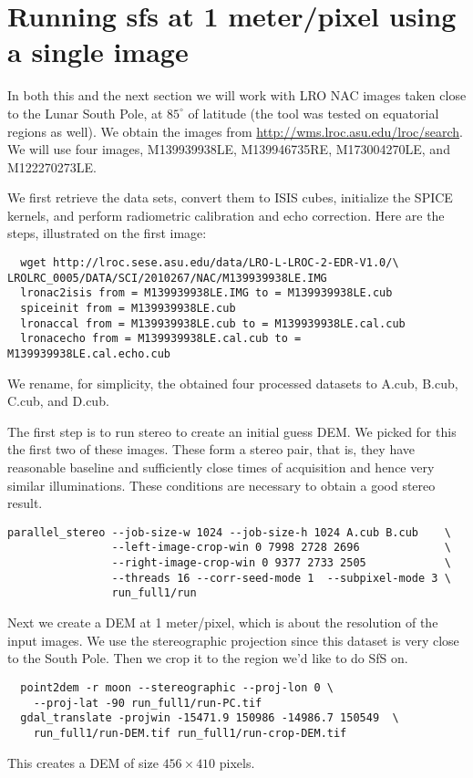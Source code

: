 \section{Running sfs at 1 meter/pixel using a single image}

In both this and the next section we will work with LRO NAC images taken
close to the Lunar South Pole, at $85^\circ$ of latitude (the tool was
tested on equatorial regions as well). We obtain the images from
\url{http://wms.lroc.asu.edu/lroc/search}.  We will use four images,
M139939938LE, M139946735RE, M173004270LE, and M122270273LE.

We first retrieve the data sets, convert them to ISIS cubes, initialize
the SPICE kernels, and perform radiometric calibration and echo
correction. Here are the steps, illustrated on the first image:
\begin{verbatim}
  wget http://lroc.sese.asu.edu/data/LRO-L-LROC-2-EDR-V1.0/\
LROLRC_0005/DATA/SCI/2010267/NAC/M139939938LE.IMG
  lronac2isis from = M139939938LE.IMG to = M139939938LE.cub
  spiceinit from = M139939938LE.cub
  lronaccal from = M139939938LE.cub to = M139939938LE.cal.cub
  lronacecho from = M139939938LE.cal.cub to = M139939938LE.cal.echo.cub
\end{verbatim}
We rename, for simplicity, the obtained four processed datasets to
A.cub, B.cub, C.cub, and D.cub.

The first step is to run stereo to create an initial guess DEM. We
picked for this the first two of these images. These form a stereo pair,
that is, they have reasonable baseline and sufficiently close times of
acquisition and hence very similar illuminations. These conditions are
necessary to obtain a good stereo result.
\begin{verbatim}
parallel_stereo --job-size-w 1024 --job-size-h 1024 A.cub B.cub    \
                --left-image-crop-win 0 7998 2728 2696             \
                --right-image-crop-win 0 9377 2733 2505            \
                --threads 16 --corr-seed-mode 1  --subpixel-mode 3 \
                run_full1/run
\end{verbatim}
Next we create a DEM at 1 meter/pixel, which is about the resolution
of the input images. We use the stereographic projection since this
dataset is very close to the South Pole. Then we crop it to the region
we'd like to do SfS on.
\begin{verbatim}
  point2dem -r moon --stereographic --proj-lon 0 \
    --proj-lat -90 run_full1/run-PC.tif
  gdal_translate -projwin -15471.9 150986 -14986.7 150549  \
    run_full1/run-DEM.tif run_full1/run-crop-DEM.tif
\end{verbatim}
This creates a DEM of size $456 \times 410$ pixels.

